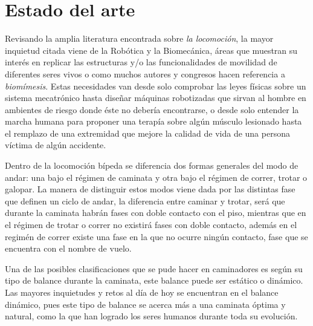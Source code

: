 \mode*
\section[Estado del arte]{Estado del arte}
\label{sec:arte}

Revisando la amplia literatura encontrada sobre \emph{la locomoci\'on}, la mayor inquietud citada viene de la Rob\'otica\cite{Xiang2010,Mattar2013} y la Biomec\'anica\cite{Xiang2010,Mattar2013}, \'areas que muestran su interés en replicar las estructuras y/o las funcionalidades de movilidad de diferentes seres vivos\cite{Xu2013,Chiang2013} o como muchos autores\cite{Xu2013} y congresos\cite{RB2009} hacen referencia a \emph{biom\'imesis}. Estas necesidades van desde solo comprobar las leyes f\'isicas sobre un sistema mecatr\'onico\cite{Barker2010,Lens2011} hasta dise\~nar m\'aquinas robotizadas que sirvan al hombre en ambientes de riesgo donde \'este no deber\'ia encontrarse\cite{Seifried2014,Wu2013a}, o desde solo entender la marcha humana para proponer una terap\'ia sobre alg\'un m\'usculo lesionado\cite{Kang2013} hasta el remplazo de una extremidad que mejore la calidad de vida de una persona v\'ictima de alg\'un accidente\cite{Roa2006,Wu2013a}.\par
Dentro de la locomoci\'on b\'ipeda se diferencia dos formas generales del modo de andar: una bajo el r\'egimen de caminata y otra bajo el r\'egimen de correr, trotar o galopar\cite{Geyer2006}. La manera de distinguir estos modos viene dada por las distintas fase que definen un ciclo de andar, la diferencia entre caminar y trotar, ser\'a que durante la caminata habr\'an fases con doble contacto con el piso, mientras que en el r\'egimen de trotar o correr no existirá fases con doble contacto\cite{Geyer2006}, adem\'as en el regim\'en de correr existe una fase en la que no ocurre ningún contacto, fase que se encuentra con el nombre de vuelo.\par
Una de las posibles clasificaciones que se pude hacer en caminadores es seg\'un su tipo de balance durante la caminata, este balance puede ser est\'atico o din\'amico\cite{Braunl2008}. Las mayores inquietudes y retos al d\'ia de hoy se encuentran en el balance din\'amico, pues este tipo de balance se acerca m\'as a una caminata \'optima y natural, como la que han logrado los seres humanos durante toda su evoluci\'on.\par

